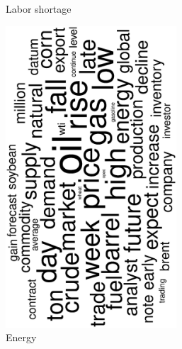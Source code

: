 \begin{figure}
\begin{subfigure}{0.32\textwidth}
		\caption{Labor shortage}
	\end{subfigure}
	\begin{subfigure}{0.32\textwidth}
		\includegraphics[width=0.7\textwidth,angle=270]{figures/wordcloud1.eps}
		\caption{Energy}
	\end{subfigure}	
	\begin{subfigure}{0.32\textwidth}

\end{subfigure}
\end{figure}
